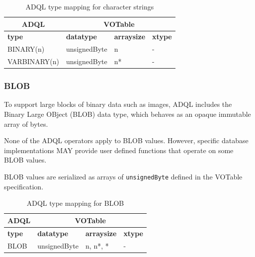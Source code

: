 \documentclass[11pt,a4paper]{ivoa}
\newcommand{\VOTspec}{VOTable specification\xspace}
\begin{document}
\begin{table}[thm]\footnotesize
    \begin{tabular}
        {|p{}|p{}|p{}|p{}|}
        \hline

        \hline
        \multicolumn{1}{|c|}{\textbf{ADQL}} &
        \multicolumn{3}{|c|}{\textbf{VOTable}}
        \tabularnewline
        
        \hline
        \textbf{type} &
        \textbf{datatype} &
        \textbf{arraysize} &
        \textbf{xtype}
        \tabularnewline

        \hline
        BINARY(n) &
        unsignedByte &
        n &
        -
        \tabularnewline

        \hline
        VARBINARY(n) &
        unsignedByte &
        n* &
        -
        \tabularnewline

        \hline
    \end{tabular}
    \caption{ADQL type mapping for character strings}
    \label{table:types.binary.primitive}
\end{table}

\subsubsection{BLOB}
\label{sec:types.binary.blob}

To support large blocks of binary data such as images,
ADQL includes the Binary Large OBject (BLOB) data type,
which behaves as an opaque immutable array of bytes.

None of the ADQL operators apply to BLOB values.
However, specific database implementations MAY provide user
defined functions that operate on some BLOB values.

BLOB values are serialized as arrays of \verb:unsignedByte: defined
in the \VOTspec.

\begin{table}[thm]\footnotesize
    \begin{tabular}
        {|p{}|p{}|p{}|p{}|}
        \hline

        \hline
        \multicolumn{1}{|c|}{\textbf{ADQL}} &
        \multicolumn{3}{|c|}{\textbf{VOTable}}
        \tabularnewline
        
        \hline
        \textbf{type} &
        \textbf{datatype} &
        \textbf{arraysize} &
        \textbf{xtype}
        \tabularnewline

        \hline
        BLOB &
        unsignedByte  &
        n, n*, * &
        -
        \tabularnewline

        \hline
    \end{tabular}
    \caption{ADQL type mapping for BLOB}
    \label{table:types.binary.blob}
\end{table}
\end{document}

